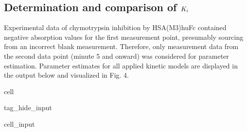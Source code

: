\documentclass[letterpaper,12pt,english]{jupyterBook}
\begin{document}
\subsection{Determination and comparison of \protect\(K_{i}\protect\)}
\label{\detokenize{scenarios/chymotrypsin_inhibition:determination-and-comparison-of-k-i}}
\sphinxAtStartPar
Experimental data of chymotrypsin inhibition by HSA(M3)\sphinxhyphen{}huFc contained negative absorption values for the first measurement point, presumably sourcing from an incorrect blank measurement. Therefore, only measurement data from the second data point (minute 5 and onward) was considered for parameter estimation.
Parameter estimates for all applied kinetic models are displayed in the output below and visualized in Fig. 4.

\begin{sphinxuseclass}{cell}
\begin{sphinxuseclass}{tag_hide_input}\begin{sphinxVerbatimInput}

\begin{sphinxuseclass}{cell_input}
\begin{sphinxVerbatim}[commandchars=\\\{\}]
     
\PYG{p}{[}   \PYG{p}{]}   
\PYG{p}{[} \PYG{p}{]}\PYGZbs{}


\end{sphinxVerbatim}
\end{sphinxuseclass}
\end{sphinxVerbatimInput}
\end{sphinxuseclass}
\end{sphinxuseclass}
\end{document}
